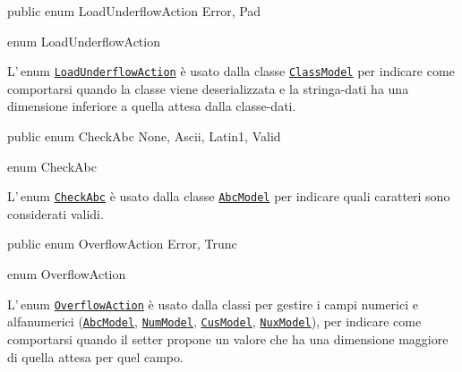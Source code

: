 \documentclass[a4paper,10pt]{report}
\newif\ifesource
\newenvironment{elisting}[1][!htb]
  {\captionsetup{aboveskip=0pt}\begin{listing}[#1]}
  {\end{listing}%
}
\begin{document}
\ifesource
\begin{lstlisting}[language=java, 
caption=enum LoadUnderflowAction, 
label=lst:LoadUnderflowAction]
public enum LoadUnderflowAction { Error, Pad }
\end{lstlisting}\index{LoadUnderflowAction}
\else
\begin{elisting}
\begin{javacode}
public enum LoadUnderflowAction { Error, Pad }
\end{javacode}
\caption{enum LoadUnderflowAction}\label{lst:LoadUnderflowAction}
\end{elisting}
\fi
L'\,enum \hyperref[lst:LoadUnderflowAction]{\texttt{LoadUnderflowAction}} è 
usato dalla classe \hyperref[lst:ClassModel]{\texttt{ClassModel}} per indicare 
come comportarsi quando la classe viene deserializzata e la stringa-dati ha una 
dimensione inferiore a quella attesa dalla classe-dati.

\ifesource
\begin{lstlisting}[language=java, 
caption=enum CheckAbc, 
label=lst:CheckAbc]
public enum CheckAbc { None, Ascii, Latin1, Valid }
\end{lstlisting}\index{CheckAbc}
\else
\begin{elisting}
\begin{javacode}
public enum CheckAbc { None, Ascii, Latin1, Valid }
\end{javacode}
\caption{enum CheckAbc}\label{lst:CheckAbc}
\end{elisting}
\fi
L'\,enum \hyperref[lst:CheckAbc]{\texttt{CheckAbc}} è usato dalla classe
\hyperref[lst:AbcModel]{\texttt{AbcModel}} per indicare quali caratteri sono
considerati validi.

\ifesource
\begin{lstlisting}[language=java, 
caption=enum OverflowAction, 
label=lst:OverflowAction]
public enum OverflowAction { Error, Trunc }
\end{lstlisting}\index{OverflowAction}
\else
\begin{elisting}
\begin{javacode}
public enum OverflowAction { Error, Trunc }
\end{javacode}
\caption{enum OverflowAction}\label{lst:OverflowAction}
\end{elisting}
\fi
L'\,enum \hyperref[lst:OverflowAction]{\texttt{OverflowAction}} è usato dalla 
classi per gestire i campi numerici e alfanumerici 
(\hyperref[lst:AbcModel]{\texttt{AbcModel}},\break
\hyperref[lst:NumModel]{\texttt{NumModel}},
\hyperref[lst:CusModel]{\texttt{CusModel}},
\hyperref[lst:NuxModel]{\texttt{NuxModel}}), per indicare come comportarsi
quando il setter propone un valore che ha una dimensione maggiore di quella
attesa per quel campo.
\end{document}
